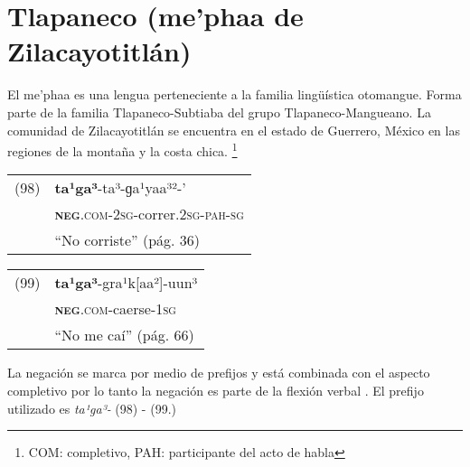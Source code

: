 \section*{Tlapaneco (me’phaa de Zilacayotitlán)}

\noindent El me’phaa es una lengua perteneciente a la familia lingüística otomangue. Forma parte de la familia Tlapaneco-Subtiaba del grupo Tlapaneco-Mangueano. La comunidad de Zilacayotitlán se encuentra en el estado de Guerrero, México en las regiones de la montaña y la costa chica.
\footnote{COM: completivo, PAH: participante del acto de habla}
\vspace{0.5cm}

{\setmainfont{Charis SIL} 

\begin{tabular}{ll}
(98) & \textbf{ta¹ga³}-ta³-ɡa¹yaa³²-’\\
& \textsc{\textbf{neg}.com-2sg}-correr.\textsc{2sg-pah-sg}\\
& ``No corriste'' (pág. 36)
\end{tabular} \vspace{0.5cm}

\begin{tabular}{ll}
(99) & \textbf{ta¹ga³}-gra¹k[aa²]-uun³ \\
& \textsc{\textbf{neg}.com}-caerse-\textsc{1sg} \\
& ``No me caí'' (pág. 66)
\end{tabular} \vspace{0.5cm}

}

La negación se marca por medio de prefijos y está combinada con el aspecto completivo por lo tanto la negación es parte de la flexión verbal \textcolor{MidnightBlue}{\citep{Tlapaneco}}. El prefijo utilizado es {\setmainfont{Charis SIL} \textit{ta¹ga³-}} (98) - (99.)